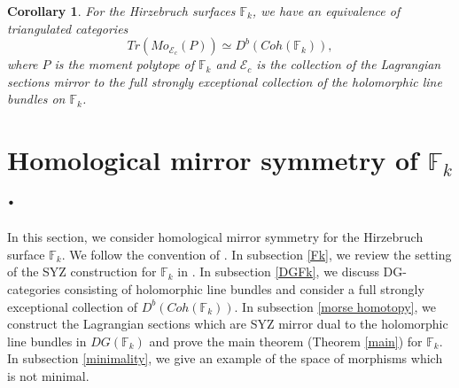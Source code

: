 \documentclass[12pt,reqno]{amsart}
\newcommand{\F}{{\mathbb{F}}}
\newcommand{\Fk}{{\F_k}}
\newcommand{\cE}{{\mathcal{E}}}
\newtheorem{cor}[thm]{Corollary}%
\theoremstyle{definition}
\begin{document}
\begin{cor}\label{main cor}
For the Hirzebruch surfaces $\Fk$, we have an equivalence of triangulated categories
\begin{equation*}
Tr(Mo_{\cE_c}(P)) \simeq D^b(Coh(\Fk)),
\end{equation*}
where $P$ is the moment polytope of $\Fk$ and $\cE_c$ is the collection of the Lagrangian sections mirror to the full strongly exceptional collection of the holomorphic line bundles on $\Fk$.
\end{cor}



\section{Homological mirror symmetry of $\Fk$.}
In this section, we consider homological mirror symmetry for the Hirzebruch surface $\Fk$. We follow the convention of \cite{fut-kaj2}.
In subsection \ref{Fk}, we review the setting of the SYZ construction for $\Fk$ in \cite{fut-kaj2}. In subsection \ref{DGFk}, we discuss DG-categories consisting of holomorphic line bundles and consider a full strongly exceptional collection of $D^b(Coh(\Fk))$. In subsection \ref{morse homotopy}, we construct the Lagrangian sections which are SYZ mirror dual to the holomorphic line bundles in $DG(\Fk)$ and prove the main theorem (Theorem \ref{main}) for $\Fk$. In subsection \ref{minimality}, we give an example of the space of morphisms which is not minimal.
\end{document}
